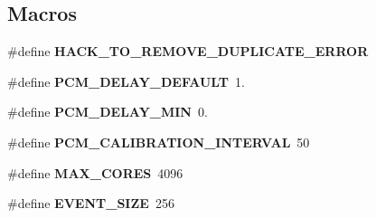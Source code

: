 \subsection*{Macros}
\begin{DoxyCompactItemize}
\item 
\mbox{\label{pcm-core_8cpp_ac4eeb11d89b0f517835a12a04443ebe4}} 
\#define {\bfseries H\+A\+C\+K\+\_\+\+T\+O\+\_\+\+R\+E\+M\+O\+V\+E\+\_\+\+D\+U\+P\+L\+I\+C\+A\+T\+E\+\_\+\+E\+R\+R\+OR}
\item 
\mbox{\label{pcm-core_8cpp_aa9ecc55c90c7a69729babc4f5f91ed96}} 
\#define {\bfseries P\+C\+M\+\_\+\+D\+E\+L\+A\+Y\+\_\+\+D\+E\+F\+A\+U\+LT}~1.
\item 
\mbox{\label{pcm-core_8cpp_acccbe8441d6dd75bdc949f5f0ee126c5}} 
\#define {\bfseries P\+C\+M\+\_\+\+D\+E\+L\+A\+Y\+\_\+\+M\+IN}~0.
\item 
\mbox{\label{pcm-core_8cpp_a433dde946b6713059756318598c9a6fe}} 
\#define {\bfseries P\+C\+M\+\_\+\+C\+A\+L\+I\+B\+R\+A\+T\+I\+O\+N\+\_\+\+I\+N\+T\+E\+R\+V\+AL}~50
\item 
\mbox{\label{pcm-core_8cpp_a009855593b59738d24dbfc236edb3b14}} 
\#define {\bfseries M\+A\+X\+\_\+\+C\+O\+R\+ES}~4096
\item 
\mbox{\label{pcm-core_8cpp_a228783873815e02b069a286af4512aba}} 
\#define {\bfseries E\+V\+E\+N\+T\+\_\+\+S\+I\+ZE}~256
\end{DoxyCompactItemize}
